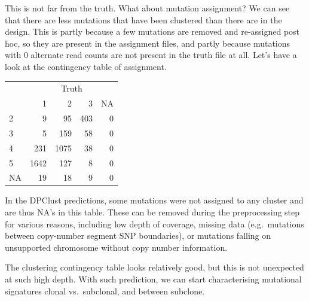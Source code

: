 \documentclass[]{article}
\newenvironment{Shaded}{\begin{snugshade}}{\end{snugshade}}
\newcommand{\DataTypeTok}[1]{\textcolor[rgb]{0.13,0.29,0.53}{#1}}
\newcommand{\DecValTok}[1]{\textcolor[rgb]{0.00,0.00,0.81}{#1}}
\newcommand{\KeywordTok}[1]{\textcolor[rgb]{0.13,0.29,0.53}{\textbf{#1}}}
\newcommand{\NormalTok}[1]{#1}
\newcommand{\OperatorTok}[1]{\textcolor[rgb]{0.81,0.36,0.00}{\textbf{#1}}}
\newcommand{\StringTok}[1]{\textcolor[rgb]{0.31,0.60,0.02}{#1}}
\begin{document}
This is not far from the truth. What about mutation assignment? We can
see that there are less mutations that have been clustered than there
are in the design. This is partly because a few mutations are removed
and re-assigned post hoc, so they are present in the assignment files,
and partly because mutations with 0 alternate read counts are not
present in the truth file at all. Let's have a look at the contingency
table of assignment.

\begin{Shaded}
\end{Shaded}

\begin{table}[H]
\centering
\begin{tabular}{lrrrr}
\toprule
\multicolumn{1}{c}{} & \multicolumn{4}{c}{Truth} \\
\cmidrule(l{3pt}r{3pt}){2-5}
  & 1 & 2 & 3 & NA\\
\midrule
2 & 9 & 95 & 403 & 0\\
3 & 5 & 159 & 58 & 0\\
4 & 231 & 1075 & 38 & 0\\
5 & 1642 & 127 & 8 & 0\\
NA & 19 & 18 & 9 & 0\\
\bottomrule
\end{tabular}
\end{table}

In the DPClust predictions, some mutations were not assigned to any
cluster and are thus NA's in this table. These can be removed during the
preprocessing step for various reasons, including low depth of coverage,
missing data (e.g.~mutations between copy-number segment SNP
boundaries), or mutations falling on unsupported chromosome without copy
number information.

The clustering contingency table looks relatively good, but this is not
unexpected at such high depth. With such prediction, we can start
characterising mutational signatures clonal vs.~subclonal, and between
subclone.
\end{document}
